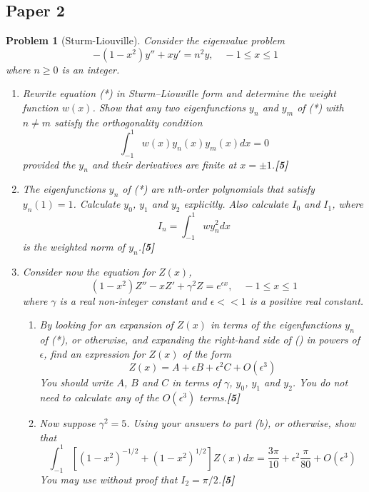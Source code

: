 \documentclass[a4paper]{article}
\theoremstyle{new}
\newtheorem{qns}{Problem}[section]
\begin{document}
\subsection{Paper 2}
\begin{qns}[Sturm-Liouville]
Consider the eigenvalue problem
\begin{equation}
    -(1-x^2)y''+xy'=n^2y,\quad-1\leq x\leq 1\tag{*}
\end{equation}
where $n\geq 0$ is an integer.
\begin{enumerate}[label=(\alph*)]
\item Rewrite equation (*) in Sturm–Liouville form and determine the weight function $w(x)$. Show that any two eigenfunctions $y_n$ and $y_m$ of (*) with $n\neq m$ satisfy the orthogonality condition 
$$\int_{-1}^1w(x)y_n(x)y_m(x)dx=0$$
provided the $y_n$ and their derivatives are finite at $x = \pm1$.\hfill\textbf{[5]}
\item 
The eigenfunctions $y_n$ of (*) are $n$th-order polynomials that satisfy $y_n(1) = 1$. Calculate $y_0$, $y_1$ and $y_2$ explicitly. Also calculate $I_0$ and $I_1$, where
$$I_n=\int_{-1}^1wy_n^2dx$$
is the weighted norm of $y_n$.\hfill\textbf{[5]}
\item Consider now the equation for $Z(x)$,
\begin{equation}
    (1-x^2)Z''-xZ'+\gamma^2Z=e^{\epsilon x},\quad -1\leq x\leq 1\tag{\dag}
\end{equation}
where $\gamma$ is a real non-integer constant and $\epsilon<<1$ is a positive real constant.
\begin{enumerate}[label=(\roman*)]
\item
By looking for an expansion of $Z(x)$ in terms of the eigenfunctions $y_n$ of (*), or otherwise, and expanding the right-hand side of (\dag) in powers of $\epsilon$, find an expression for $Z(x)$ of the form
$$Z(x)=A+\epsilon B+\epsilon^2C+O(\epsilon^3)$$
You should write $A$, $B$ and $C$ in terms of $\gamma$, $y_0$, $y_1$ and $y_2$. You do not need to calculate any of the $O(\epsilon^3)$ terms.\hfill\textbf{[5]}
\item Now suppose $\gamma^2=5$. Using your answers to part (b), or otherwise, show that
$$\int_{-1}^1[(1-x^2)^{-1/2}+(1-x^2)^{1/2}]Z(x)dx=\frac{3\pi}{10}+\epsilon^2\frac{\pi}{80}+O(\epsilon^3)$$
You may use without proof that $I_2=\pi/2$.\hfill\textbf{[5]}
\end{enumerate}
\end{enumerate}
\end{qns}
\end{document}
